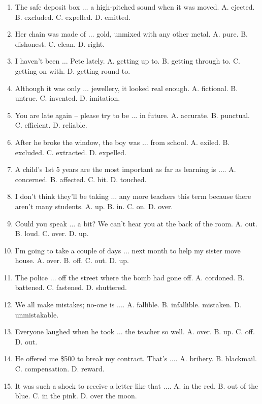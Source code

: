 \documentclass{article}
\numberwithin{equation}{section}
\begin{document}
\begin{enumerate}[leftmargin=2mm]
	\item The safe deposit box $\ldots$ a high-pitched sound when it was moved. {\sf A.} ejected. {\sf B.} excluded. {\sf C.} expelled. {\sf D.} emitted.
	\item Her chain was made of $\ldots$ gold, unmixed with any other metal. {\sf A.} pure. {\sf B.} dishonest. {\sf C.} clean. {\sf D.} right.
	\item I haven't been $\ldots$ Pete lately. {\sf A.} getting up  to. {\sf B.} getting through to. {\sf C.} getting on with. {\sf D.} getting round to.
	\item Although it was only $\ldots$ jewellery, it looked real enough. {\sf A.} fictional. {\sf B.} untrue. {\sf C.} invented. {\sf D.} imitation.
	\item You are late again -- please try to be $\ldots$ in future. {\sf A.} accurate. {\sf B.} punctual. {\sf C.} efficient. {\sf D.} reliable.
	\item After he broke the window, the boy was $\ldots$ from school. {\sf A.} exiled. {\sf B.} excluded. {\sf C.} extracted. {\sf D.} expelled.
	\item A child's 1st 5 years are the most important as far as learning is $\ldots$. {\sf A.} concerned. {\sf B.} affected. {\sf C.} hit. {\sf D.} touched.
	\item I don't think they'll be taking $\ldots$ any more teachers this term because there aren't many students. {\sf A.} up. {\sf B.} in. {\sf C.} on. {\sf D.} over.
	\item Could you speak $\ldots$ a bit? We can't hear you at the back of the room. {\sf A.} out. {\sf B.} loud. {\sf C.} over. {\sf D.} up.
	\item I'm going to take a couple of days $\ldots$ next month to help my sister move house. {\sf A.} over. {\sf B.} off. {\sf C.} out. {\sf D.} up.
	\item The police $\ldots$ off the street where the bomb had gone off. {\sf A.} cordoned. {\sf B.} battened. {\sf C.} fastened. {\sf D.} shuttered.
	\item We all make mistakes; no-one is $\ldots$. {\sf A.} fallible. {\sf B.} infallible. mistaken. {\sf D.} unmistakable.
	\item Everyone laughed when he took $\ldots$ the teacher so well. {\sf A.} over. {\sf B.} up. {\sf C.} off. {\sf D.} out.
	\item He offered me \$500 to break my contract. That's $\ldots$. {\sf A.} bribery. {\sf B.} blackmail. {\sf C.} compensation. {\sf D.} reward.
	\item It was such a shock to receive a letter like that $\ldots$. {\sf A.} in the red. {\sf B.} out of the blue. {\sf C.} in the pink. {\sf D.} over the moon.

\end{enumerate}
\end{document}
